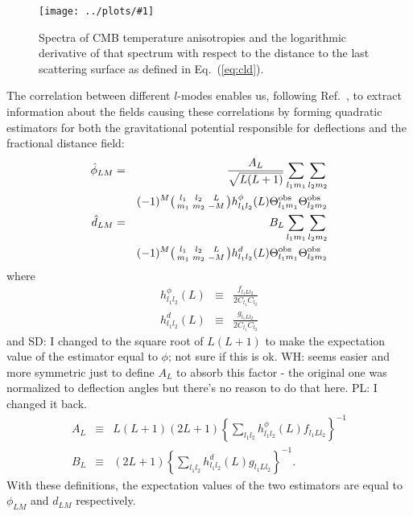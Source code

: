 \documentclass[prl,amsmath,amssymb,floatfix,superscriptaddress,nofootinbib,twocolumn]{revtex4-1}
\def\bea{\begin{eqnarray}}
\def\eea{\end{eqnarray}}
\newcommand{\ec}[1]{Eq.~(\ref{eq:#1})}
\newcommand{\eql}[1]{\label{eq:#1}}
\newcommand{\sfig}[2]{
\texttt{[image: ../plots/\#1]}
        }
\newcommand{\Spng}[2]{
   \begin{figure}[thbp]
   \begin{center}
    \sfig{#1.png}{\columnwidth}
    \caption{{\small #2}}
    \label{fig:#1}
     \end{center}
   \end{figure}
}
\newcommand{\scott}[1]{{\color{darkgreen} SD: #1}}
\newcommand{\peikai}[1]{{\color{blue} PL: #1}}
\newcommand{\wh}[1]{{\color{red} WH: #1}}
\begin{document}
\Spng{TT1}{Spectra of CMB temperature anisotropies and the logarithmic derivative of that spectrum with respect to the distance to the last scattering surface as defined in \ec{cld}.}


The correlation between different $l$-modes enables us, following Ref.~\cite{Okamoto:2003zw}, to extract information about the fields causing these correlations by forming quadratic estimators for both the gravitational potential responsible for deflections and the fractional distance field:
\bea
\hat \phi_{LM} &=& \frac{A_{L}}{\sqrt{L(L+1)}}\sum_{l_1m_1}\sum_{l_2m_2} \nonumber \\  
&& (-1)^M  \bigl(\begin{smallmatrix} l_1 & l_2 & L \\ m_1 & m_2 & -M  \end{smallmatrix}\bigr) h^{\phi}_{l_1l_2}(L)  \tob_{l_1m_1} \tob_{l_2m_2} \\
\hat d_{LM} &=& B_{L} \sum_{l_1m_1}\sum_{l_2m_2}\nonumber \\
&& (-1)^M  \bigl(\begin{smallmatrix} l_1 & l_2 & L \\ m_1 & m_2 & -M  \end{smallmatrix}\bigr) h^{d}_{l_1l_2}(L)  \tob_{l_1m_1} \tob_{l_2m_2}\eql{distest}
\eea
where
\bea
h^{\phi}_{l_1l_2}(L)&\equiv& \frac{f_{l_1Ll_2}}{2C_{l_1}C_{l_2}} \\
h^{d}_{l_1l_2}(L)&\equiv& \frac{g_{l_1Ll_2}}{2C_{l_1}C_{l_2}}
\eea
and \scott{I changed to the square root of $L(L+1)$ to make the expectation value of the estimator equal to $\phi$; not sure if this is ok.} \wh{seems easier and more symmetric just to define $A_L$ to absorb this factor - the original one was normalized to
deflection angles but there's no reason to do that here.} \peikai{I changed it back.}
\bea
A_L &\equiv& L(L+1)(2L+1) \left\{ \sum_{l_1l_2} h^{\phi}_{l_1l_2}(L)f_{l_1Ll_2}\right\}^{-1}\\
B_L &\equiv& (2L+1) \left\{ \sum_{l_1l_2} h^{d}_{l_1l_2}(L)g_{l_1Ll_2}\right\}^{-1}.\eql{bt}
\eea 
With these definitions, the expectation values of the two estimators are equal to $\phi_{LM}$ and $d_{LM}$ respectively.
\end{document}
